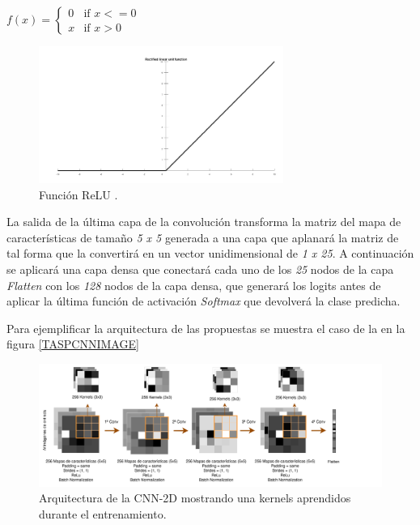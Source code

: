             \begin{center}
                $f(x) = \left\{
                               \begin{array}{lr}
                                 0 & \text{if } x<=0\\
                                 x & \text{if } x>0
                               \end{array}
                        \right.$
            \end{center}

            \begin{figure}[h]
                \centering
                \includegraphics[width=8cm]{archivos/4.Metodologia/Modelos/CNN/RELUImage}
                \caption{Función ReLU \cite{CNNReLUImage}.}
                \label{RELUImage}
             \end{figure}

            La salida de la última capa de la convolución transforma la matriz del mapa de características de tamaño \textit{5 x 5} generada a una capa que aplanará la matriz de tal forma que la convertirá en un vector unidimensional de \textit{1 x 25}. A continuación se aplicará una capa densa que conectará cada uno de los \textit{25} nodos de la capa \textit{Flatten} con los \textit{128} nodos de la capa densa, que generará los logits antes de aplicar la última función de activación \textit{Softmax} que devolverá la clase predicha.


            Para ejemplificar la arquitectura de las  propuestas se muestra el caso de la  en la figura \eqref{TASPCNNIMAGE}


            \begin{figure}[h]
                \centering
                \includegraphics[width=17cm]{archivos/4.Metodologia/Modelos/CNN/2D/TASPCNN}
                \caption{Arquitectura de la CNN-2D mostrando una  kernels aprendidos durante el entrenamiento.}
                \label{TASPCNNIMAGE}
             \end{figure}



